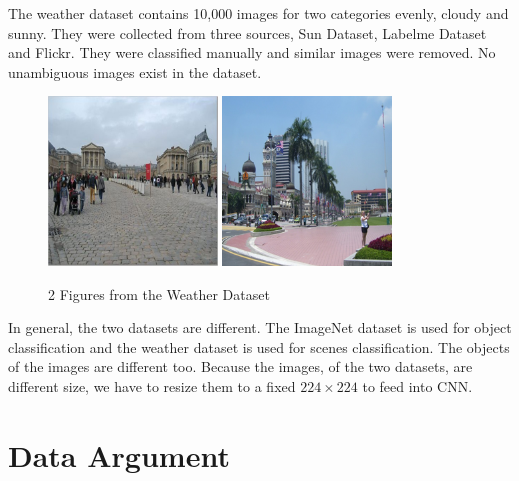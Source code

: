 The weather dataset \citep{lutwo} contains 10,000 images for two categories evenly, cloudy and sunny. They were collected from three sources, Sun Dataset\citep{russell2008labelme}, Labelme Dataset\citep{xiao2010sun} and Flickr. They were classified manually and similar images were removed. No unambiguous images exist in the dataset.
\graphicspath{ {./Figures/} }
\begin{figure}[!htb]
    \centering
	\includegraphics[width=0.4\textwidth]{cloudy_0001.png}
    \qquad
    \includegraphics[width=0.4\textwidth]{sunny_0003.png}
    \caption{2 Figures from the Weather Dataset}%
    \label{fig:WeatherExamples}%
\end{figure}

In general, the two datasets are different. The ImageNet dataset is used for object classification and the weather dataset is used for scenes classification. The objects of the images are different too. Because the images, of the two datasets, are different size, we have to resize them to a fixed $224 \times 224$ to feed into CNN.

\section{Data Argument}

